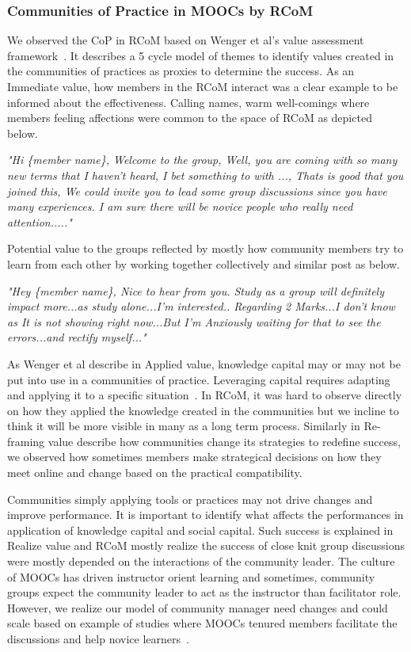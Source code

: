 \documentclass[format=acmsmall, review=false, screen=true]{acmart}
\begin{document}
\subsubsection{Communities of Practice in MOOCs by RCoM}
We observed the CoP in RCoM based on Wenger et al's value assessment framework~\cite{wenger2011promoting}. It describes a 5 cycle model of themes to identify values created in the communities of practices as proxies to determine the success. As an Immediate value, how members in the RCoM interact was a clear example to be informed about the effectiveness. Calling names, warm well-comings where members feeling affections were common to the space of RCoM as depicted below. 

\textit{"Hi \{member name\}, Welcome to the group, Well, you are coming with so many new terms that I haven't heard, I bet something to with {...}, 
Thats is good that you joined this, We could invite you to lead some group discussions since you have many experiences. I am sure there will be novice people who really need attention....."}

Potential value to the groups reflected by mostly how community members try to learn from each other by working together collectively and similar post as below. 

\textit{"Hey \{member name\}, Nice to hear from you. Study as a group will definitely impact more...as study alone...I'm interested.. Regarding 2 Marks...I don't know as It is not showing right now...But I'm Anxiously waiting for that to see the errors...and rectify myself..."}

As Wenger et al describe in Applied value, knowledge capital may or may not be put into use in a communities of practice. Leveraging capital requires adapting and applying it to a specific situation~\cite{wenger2011promoting}. In RCoM, it was hard to observe directly on how they applied the knowledge created in the communities but we incline to think it will be more visible in many as a long term process. Similarly in Re-framing value describe how communities change its strategies to redefine success, we observed how sometimes members make strategical decisions on how they meet online and change based on the practical compatibility. 

Communities simply applying tools or practices may not drive changes and improve performance. It is important to identify what affects the performances in application of knowledge capital and social capital. Such success is explained in Realize value and RCoM mostly realize the success of close knit group discussions were mostly depended on the interactions of the community leader. The culture of MOOCs has driven instructor orient learning and sometimes, community groups expect the community leader to act as the instructor than facilitator role. However, we realize our model of community manager need changes and could scale based on example of studies where MOOCs tenured members facilitate the discussions and help novice learners~\cite{nelimarkka2015alumni}. 
\end{document}
